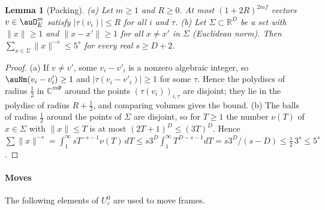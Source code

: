 \documentclass[10pt]{amsart}
\newtheorem{lemma}[theorem]{Lemma}
\theoremstyle{definition}
\theoremstyle{remark}
\newcommand{\C}{\mathbb C}
\newcommand{\R}{\mathbb R}
\providecommand{\auPl}{\Phi}
\begin{document}
\begin{lemma}[Packing]\label{pbc:pack}
\textup{(a)} Let $m\ge1$ and $R\ge0$. At most $(1+2R)^{2mf}$ vectors $v\in\auO_E^m$ satisfy $|\tau
(v_i)|\le R$ for all $i$ and $\tau$.
\textup{(b)} Let $\Sigma\subset\R^D$ be a set with $\|x\|\ge1$ and $\|x-x'\|\ge1$ for all $x\ne x'$ in
$\Sigma$ (Euclidean norm). Then $\sum_{x\in\Sigma}\|x\|^{-s}\le5^s$ for every real $s\ge D+2$.
\end{lemma}
\begin{proof}
(a) If $v\ne v'$, some $v_i-v'_i$ is a nonzero algebraic integer, so $\auNm(v_i-v'_i)\ge1$ and
$|\tau(v_i-v'_i)|\ge1$ for some $\tau$. Hence the polydiscs of radius $\frac12$ in $\C^{m\auPl}$ around
the points $(\tau(v_i))_{i,\tau}$ are disjoint; they lie in the polydisc of radius $R+\frac12$, and
comparing volumes gives the bound. (b) The balls of radius $\frac12$ around the points of $\Sigma$
are disjoint, so for $T\ge1$ the number $\nu(T)$ of $x\in\Sigma$ with $\|x\|\le T$ is at most
$(2T+1)^D\le(3T)^D$. Hence $\sum\|x\|^{-s}=\int_1^\infty sT^{-s-1}\nu(T)\,dT\le s3^D\int_1^\infty
T^{D-s-1}dT=s3^D/(s-D)\le\frac s2\,3^s\le5^s$.
\end{proof}

\paragraph*{Moves}
The following elements of $U_c^0$ are used to move frames.
\end{document}
